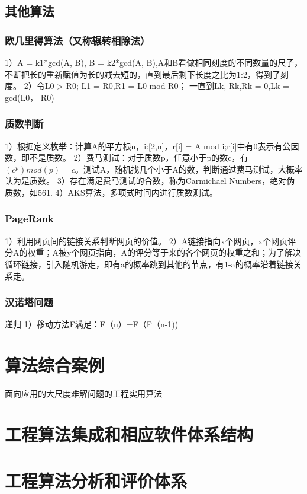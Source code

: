 \documentclass[UTF8]{../computerUniverse}
\begin{document}
\section{其他算法}

\subsection{欧几里得算法（又称辗转相除法）}
1）A = k1*gcd(A, B), B = k2*gcd(A, B),A和B看做相同刻度的不同数量的尺子，不断把长的重新赋值为长的减去短的，直到最后剩下长度之比为1:2，得到了刻度。
2）令L0 > R0;
L1 = R0,R1 = L0 mod R0；
一直到Lk, Rk,Rk = 0,Lk = gcd(L0， R0)


\subsection{质数判断}
1）根据定义枚举：计算A的平方根n，i:[2,n]，r[i] = A mod i;r[i]中有0表示有公因数，即不是质数。
2）费马测试：对于质数p，任意小于p的数c，有$(c^p)mod(p) = c$。测试A，随机找几个小于A的数，判断通过费马测试，大概率认为是质数。
3）存在满足费马测试的合数，称为Carmichael Numbers，绝对伪质数，如561.
4）AKS算法，多项式时间内进行质数测试。


\subsection{PageRank}
1）利用网页间的链接关系判断网页的价值。
2）A链接指向x个网页，x个网页评分A的权重；A被y个网页指向，A的评分等于来的各个网页的权重之和；为了解决循环链接，引入随机游走，即有a的概率跳到其他的节点，有1-a的概率沿着链接关系走。


\subsection{汉诺塔问题}
递归
1）移动方法F满足：F（n）=F（F（n-1))



\chapter{算法综合案例}
面向应用的大尺度难解问题的工程实用算法


\chapter{工程算法集成和相应软件体系结构}

\chapter{工程算法分析和评价体系}
\end{document}
